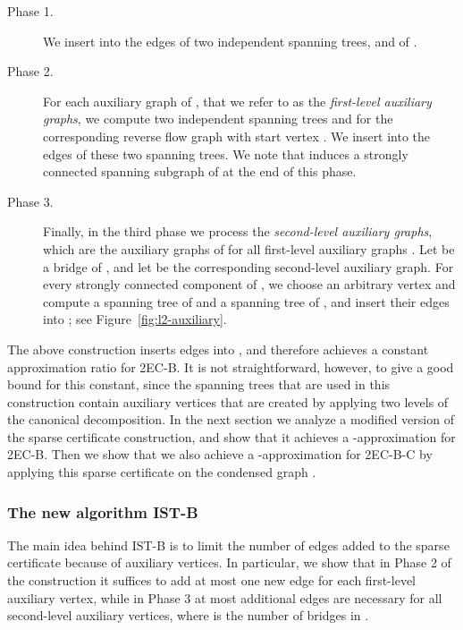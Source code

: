 \documentclass[11pt]{article}
\begin{document}
\begin{description}
\item[Phase 1.] We insert into  the edges of two independent
spanning trees,  and  of .

\item[Phase 2.] For each auxiliary graph  of , that we
refer to as the \emph{first-level auxiliary graphs}, we compute
two independent spanning trees  and  for the
corresponding reverse flow graph  with start vertex .
We insert into  the edges of these two spanning trees. We note
that  induces a strongly connected spanning subgraph of  at
the end of this phase.

\item[Phase 3.] Finally, in the third phase we process the \emph{second-level auxiliary graphs}, which are the auxiliary graphs of  for all first-level auxiliary graphs .
Let  be a bridge of , and let  be the corresponding second-level auxiliary graph.
For every strongly connected component  of , we choose an arbitrary vertex  and compute a spanning tree of  and a spanning tree of , and insert their edges into ; see Figure~\ref{fig:l2-auxiliary}.
\end{description}

The above construction inserts  edges into , and therefore achieves a constant approximation ratio for \textsf{2EC-B}. It is not straightforward, however, to give a good bound for this constant, since the spanning trees that are used in this construction contain auxiliary vertices that are created by applying two levels of the canonical decomposition. In the next section we analyze a modified version of the sparse certificate construction, and show that it achieves a -approximation for \textsf{2EC-B}. Then we show that we also achieve a -approximation for \textsf{2EC-B-C} by applying this sparse certificate on the condensed graph .

\subsubsection{The new algorithm \textsf{IST-B}}
\label{section:IST-modified}

The main idea behind \textsf{IST-B} is to limit the number of edges added to the sparse certificate  because of auxiliary vertices.
In particular, we show that in Phase 2 of the construction it suffices to add at most one new edge for each first-level auxiliary vertex,
while in Phase 3 at most  additional edges are necessary for all second-level auxiliary vertices, where  is the number of bridges in .
\end{document}
